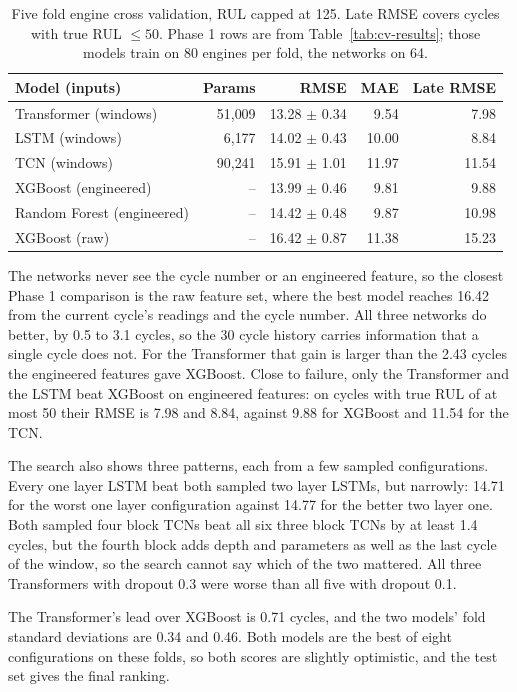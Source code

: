 \begin{table}[t]
\centering
\caption{Five fold engine cross validation, RUL capped at 125. Late RMSE
covers cycles with true RUL $\le 50$. Phase 1 rows are from
Table~\ref{tab:cv-results}; those models train on 80 engines per fold,
the networks on 64.}
\label{tab:dl-cv}
\footnotesize
\setlength{\tabcolsep}{3pt}
\begin{tabular}{lrrrr}
\hline
Model (inputs) & Params & RMSE & MAE & Late RMSE \\
\hline
Transformer (windows) & 51{,}009 & 13.28 $\pm$ 0.34 & 9.54 & 7.98 \\
LSTM (windows) & 6{,}177 & 14.02 $\pm$ 0.43 & 10.00 & 8.84 \\
TCN (windows) & 90{,}241 & 15.91 $\pm$ 1.01 & 11.97 & 11.54 \\
\hline
XGBoost (engineered) & -- & 13.99 $\pm$ 0.46 & 9.81 & 9.88 \\
Random Forest (engineered) & -- & 14.42 $\pm$ 0.48 & 9.87 & 10.98 \\
XGBoost (raw) & -- & 16.42 $\pm$ 0.87 & 11.38 & 15.23 \\
\hline
\end{tabular}
\end{table}

The networks never see the cycle number or an engineered feature, so the
closest Phase 1 comparison is the raw feature set, where the best model
reaches 16.42 from the current cycle's readings and the cycle number. All
three networks do better, by 0.5 to 3.1 cycles, so the 30 cycle history
carries information that a single cycle does not. For the Transformer that
gain is larger than the 2.43 cycles the engineered features gave XGBoost.
Close to failure, only the Transformer and the LSTM beat XGBoost on
engineered features: on cycles with true RUL of at most 50 their RMSE is
7.98 and 8.84, against 9.88 for XGBoost and 11.54 for the TCN.

The search also shows three patterns, each from a few sampled
configurations. Every one layer LSTM beat both sampled two layer LSTMs, but
narrowly: 14.71 for the worst one layer configuration against 14.77 for the
better two layer one. Both sampled four block TCNs beat all six three block
TCNs by at least 1.4 cycles, but the fourth block adds depth and parameters
as well as the last cycle of the window, so the search cannot say which of
the two mattered. All three Transformers with dropout 0.3 were worse than
all five with dropout 0.1.

The Transformer's lead over XGBoost is 0.71 cycles, and the two models'
fold standard deviations are 0.34 and 0.46. Both models are the best of eight
configurations on these folds, so both scores are slightly optimistic, and
the test set gives the final ranking.

